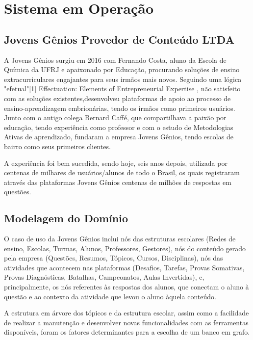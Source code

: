 \chapter{Sistema em Operação}
\label{chap5}


\section{Jovens Gênios Provedor de Conteúdo LTDA}

A Jovens Gênios surgiu em 2016 com Fernando Costa, aluno da Escola de Química da UFRJ e apaixonado por Educação, procurando soluções de ensino extracurriculares engajantes para seus irmãos mais novos. Seguindo uma lógica "efetual"[1] 
Effectuation: Elements of Entrepreneurial Expertise
, não satisfeito com as soluções existentes,desenvolveu plataformas de apoio ao processo de ensino-aprendizagem embrionárias, tendo os irmãos como primeiros usuários.
Junto com o antigo colega Bernard Caffé, que compartilhava a paixão por educação, tendo experiência como professor e com o estudo de Metodologias Ativas de aprendizado, fundaram a empresa Jovens Gênios, tendo escolas de bairro como seus primeiros clientes.

A experiência foi bem sucedida, sendo hoje, seis anos depois, utilizada por centenas de milhares de usuários/alunos de todo o Brasil, os quais registraram através das plataformas Jovens Gênios centenas de milhões de respostas em questões.

\section{Modelagem do Domínio}

O caso de uso da Jovens Gênios inclui nós das estruturas escolares (Redes de ensino, Escolas, Turmas, Alunos, Professores, Gestores), nós do conteúdo gerado pela empresa (Questões, Resumos, Tópicos, Cursos, Disciplinas), nós das atividades que acontecem nas plataformas (Desafios, Tarefas, Provas Somativas, Provas Diagnósticas, Batalhas, Campeonatos, Aulas Invertidas), e, principalmente, os nós referentes às respostas dos alunos, que conectam o aluno à questão e ao contexto da atividade que levou o aluno àquela conteúdo.

A estrutura em árvore dos tópicos e da estrutura escolar, assim como a facilidade de realizar a manutenção e desenvolver novas funcionalidades com as ferramentas disponíveis, foram os fatores determinantes para a escolha de um banco em grafo.

